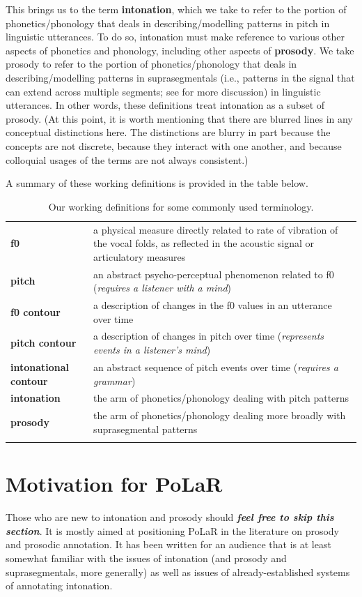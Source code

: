 \documentclass[11pt, twoside]{memoir}
\begin{document}
This brings us to the term \textbf{intonation}, which we take to refer to the portion of phonetics\slash phonology that deals in describing\slash modelling patterns in pitch in linguistic utterances. To do so, intonation must make reference to various other aspects of phonetics and phonology, including other aspects of \textbf{prosody}. We take prosody to refer to the portion of phonetics\slash phonology that deals in describing\slash modelling patterns in suprasegmentals (i.e., patterns in the signal that can extend across multiple segments; see \citealt{lehiste70} for more discussion) in linguistic utterances. In other words, these definitions treat intonation as a subset of prosody. (At this point, it is worth mentioning that there are blurred lines in any conceptual distinctions here. The distinctions are blurry in part because the concepts are not discrete, because they interact with one another, and because colloquial usages of the terms are not always consistent.)

A summary of these working definitions is provided in the table below.

\begin{longtable}{>{\bfseries}p{.175\linewidth}p{.75\linewidth}} \endhead\toprule 
f0 &
a physical measure directly related to rate of vibration of the vocal folds, as reflected in the acoustic signal or articulatory measures
\tabularnewline\hdashline
pitch &
an abstract psycho-perceptual phenomenon related to f0 (\textit{requires a listener with a mind})
\tabularnewline\hdashline
f0 contour &
a description of changes in the f0 values in an utterance over time
\tabularnewline\hdashline
pitch contour &
a description of changes in pitch over time (\textit{represents events in a listener’s mind})
\tabularnewline\hdashline
intonational contour &
an abstract sequence of pitch events over time (\textit{requires a grammar})
\tabularnewline\hdashline
intonation &
the arm of phonetics\slash phonology dealing with pitch patterns
\tabularnewline\hdashline
prosody &
the arm of phonetics\slash phonology dealing more broadly with suprasegmental patterns
\tabularnewline\bottomrule 
\caption{Our working definitions for some commonly used terminology.
\label{tab:terminology}
}
\end{longtable}


\section{Motivation for PoLaR}
Those who are new to intonation and prosody should \textit{\textbf{feel free to skip this section}}. It is mostly aimed at positioning PoLaR in the literature on prosody and prosodic annotation. It has been written for an audience that is at least somewhat familiar with the issues of intonation (and prosody and suprasegmentals, more generally) as well as issues of already-established systems of annotating intonation.
\end{document}
